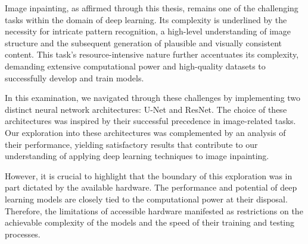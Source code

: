 

Image inpainting, as affirmed through this thesis, remains one of the challenging tasks within the domain of deep learning. Its complexity is underlined by the necessity for intricate pattern recognition, a high-level understanding of image structure and the subsequent generation of plausible and visually consistent content. This task's resource-intensive nature further accentuates its complexity, demanding extensive computational power and high-quality datasets to successfully develop and train models.

In this examination, we navigated through these challenges by implementing two distinct neural network architectures: U-Net and ResNet. The choice of these architectures was inspired by their successful precedence in image-related tasks. Our exploration into these architectures was complemented by an analysis of their performance, yielding satisfactory results that contribute to our understanding of applying deep learning techniques to image inpainting.

However, it is crucial to highlight that the boundary of this exploration was in part dictated by the available hardware. The performance and potential of deep learning models are closely tied to the computational power at their disposal. Therefore, the limitations of accessible hardware manifested as restrictions on the achievable complexity of the models and the speed of their training and testing processes.


